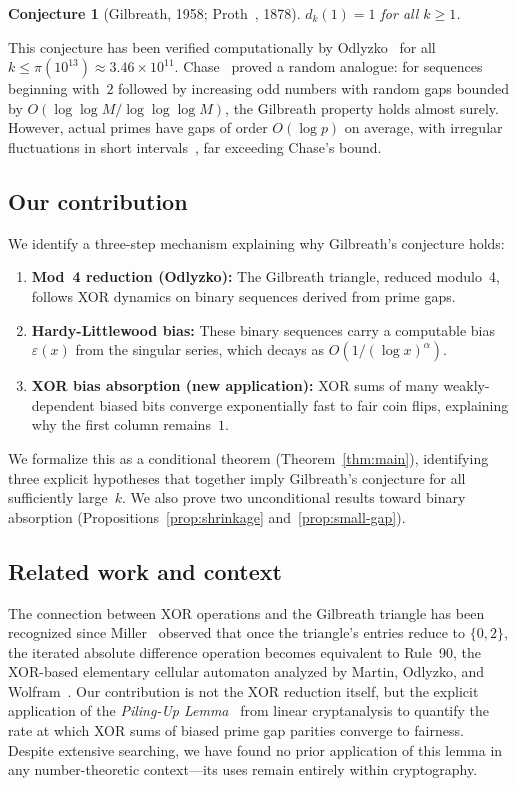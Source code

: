 \documentclass[11pt, a4paper]{amsart}
\theoremstyle{plain}
\newtheorem{conjecture}[theorem]{Conjecture}
\theoremstyle{definition}
\begin{document}
\begin{conjecture}[Gilbreath, 1958; Proth~\cite{Proth1878}, 1878]
$d_k(1) = 1$ for all $k \ge 1$.
\end{conjecture}

This conjecture has been verified computationally by Odlyzko~\cite{Odlyzko1993} for all $k \le \pi(10^{13}) \approx 3.46 \times 10^{11}$. 
Chase~\cite{Chase2020} proved a random analogue: for sequences beginning with~$2$ followed by increasing odd numbers with random gaps 
bounded by $O(\log\log M / \log\log\log M)$, the Gilbreath property holds almost surely. 
However, actual primes have gaps of order $O(\log p)$ on average, with irregular fluctuations in short intervals~\cite{Maier1985}, far exceeding Chase's bound.

\subsection{Our contribution}
We identify a three-step mechanism explaining why Gilbreath's conjecture holds:
\begin{enumerate}[(1)]
\item \textbf{Mod~4 reduction (Odlyzko):} The Gilbreath triangle, reduced modulo~4, follows XOR dynamics on binary sequences derived from prime gaps.
\item \textbf{Hardy-Littlewood bias:} These binary sequences carry a computable bias $\varepsilon(x)$ from the singular series, which decays as $O(1/(\log x)^{\alpha})$.
\item \textbf{XOR bias absorption (new application):} XOR sums of many weakly-dependent biased bits converge exponentially fast to fair coin flips, explaining why the first column remains~$1$.
\end{enumerate}

We formalize this as a conditional theorem (Theorem~\ref{thm:main}), identifying three explicit hypotheses that together imply Gilbreath's
conjecture for all sufficiently large~$k$.
We also prove two unconditional results toward binary absorption (Propositions~\ref{prop:shrinkage} and~\ref{prop:small-gap}).

\subsection{Related work and context}\label{sec:related}
The connection between XOR operations and the Gilbreath triangle has been recognized since
Miller~\cite{Miller1970} observed that once the triangle's entries reduce to $\{0, 2\}$,
the iterated absolute difference operation becomes equivalent to Rule~90, the XOR-based
elementary cellular automaton analyzed by Martin, Odlyzko, and Wolfram~\cite{MOW1984}.
Our contribution is not the XOR reduction itself, but the explicit application of the
\emph{Piling-Up Lemma}~\cite{Matsui1993} from linear cryptanalysis to quantify the
rate at which XOR sums of biased prime gap parities converge to fairness. Despite
extensive searching, we have found no prior application of this lemma in any number-theoretic
context---its uses remain entirely within cryptography.
\end{document}

